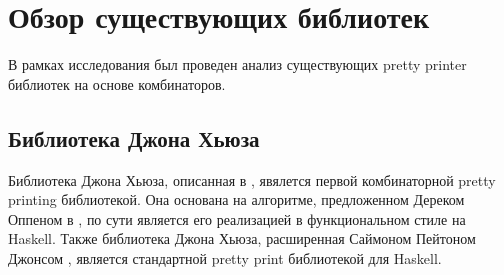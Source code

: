 \section{Обзор существующих библиотек}

В рамках исследования был проведен анализ существующих pretty printer библиотек на основе комбинаторов.

\subsection{Библиотека Джона Хьюза}
Библиотека Джона Хьюза, описанная в \cite{hughes}, явялется первой комбинаторной pretty printing библиотекой. Она основана на алгоритме, предложенном Дереком Оппеном в \cite{oppen}, по сути является его реализацией в функциональном стиле на Haskell. Также библиотека Джона Хьюза, расширенная Саймоном Пейтоном Джонсом \cite{peytonJones}, является стандартной pretty print библиотекой для Haskell.